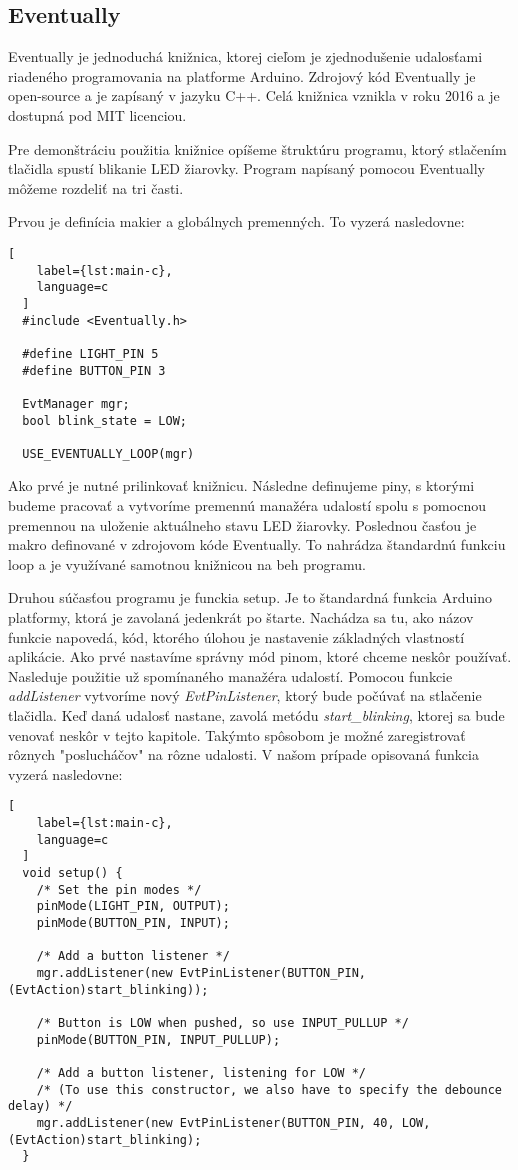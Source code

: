 \subsection{Eventually}
\noindent Eventually je jednoduchá knižnica, ktorej cieľom je zjednodušenie udalosťami riadeného 
programovania na platforme Arduino. Zdrojový kód Eventually je open-source a je zapísaný v jazyku C++. Celá knižnica vznikla v roku 2016 a je dostupná pod MIT licenciou.
\par Pre demonštráciu použitia knižnice opíšeme štruktúru programu, ktorý stlačením tlačidla spustí blikanie LED žiarovky. Program napísaný pomocou Eventually môžeme rozdeliť na tri časti.

\par Prvou je definícia makier a globálnych premenných. To vyzerá nasledovne: 
\begin{lstlisting}[
    label={lst:main-c},
    language=c
  ]  
  #include <Eventually.h>

  #define LIGHT_PIN 5
  #define BUTTON_PIN 3
  
  EvtManager mgr;
  bool blink_state = LOW;

  USE_EVENTUALLY_LOOP(mgr)
\end{lstlisting}

Ako prvé je nutné prilinkovať knižnicu. Následne definujeme piny, s ktorými budeme pracovať a vytvoríme premennú manažéra udalostí spolu s pomocnou premennou na uloženie aktuálneho stavu LED žiarovky. Poslednou časťou je makro definované v zdrojovom kóde Eventually. To nahrádza štandardnú funkciu loop a je využívané samotnou knižnicou na beh programu.

\par Druhou súčasťou programu je funckia setup. Je to štandardná funkcia Arduino platformy, ktorá je zavolaná 
jedenkrát po štarte. Nachádza sa tu, ako názov funkcie napovedá, kód, ktorého úlohou je 
nastavenie základných vlastností aplikácie. Ako prvé nastavíme správny mód pinom, ktoré chceme neskôr používať. Nasleduje použitie už
spomínaného manažéra udalostí. Pomocou funkcie \textit{addListener} vytvoríme nový \textit{EvtPinListener}, ktorý bude počúvať na stlačenie tlačidla. Keď daná udalosť nastane, zavolá metódu \textit{start\_blinking}, ktorej sa bude venovať neskôr v tejto kapitole. Takýmto spôsobom je možné zaregistrovať rôznych "poslucháčov"  na rôzne udalosti. V našom prípade opisovaná funkcia vyzerá nasledovne: 

\begin{lstlisting}[
    label={lst:main-c},
    language=c
  ]  
  void setup() {
    /* Set the pin modes */
    pinMode(LIGHT_PIN, OUTPUT);
    pinMode(BUTTON_PIN, INPUT);
  
    /* Add a button listener */
    mgr.addListener(new EvtPinListener(BUTTON_PIN, (EvtAction)start_blinking));

    /* Button is LOW when pushed, so use INPUT_PULLUP */
    pinMode(BUTTON_PIN, INPUT_PULLUP);

    /* Add a button listener, listening for LOW */
    /* (To use this constructor, we also have to specify the debounce delay) */
    mgr.addListener(new EvtPinListener(BUTTON_PIN, 40, LOW, (EvtAction)start_blinking);
  }
\end{lstlisting}

